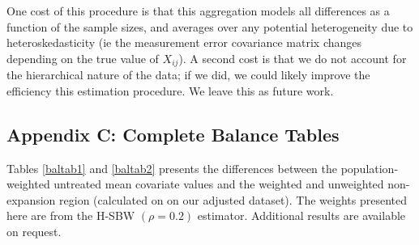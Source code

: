\documentclass[12pt]{article}
\begin{document}
One cost of this procedure is that this aggregation models all differences as a function of the sample sizes, and averages over any potential heterogeneity due to heteroskedasticity (ie the measurement error covariance matrix changes depending on the true value of $X_{ij}$). A second cost is that we do not account for the hierarchical nature of the data; if we did, we could likely improve the efficiency this estimation procedure. We leave this as future work.

\subsection{Appendix C: Complete Balance Tables}

Tables \ref{baltab1} and \ref{baltab2} presents the differences between the population-weighted untreated mean covariate values and the weighted and unweighted non-expansion region (calculated on on our adjusted dataset). The weights presented here are from the H-SBW $(\rho = 0.2)$ estimator. Additional results are available on request.
\end{document}
